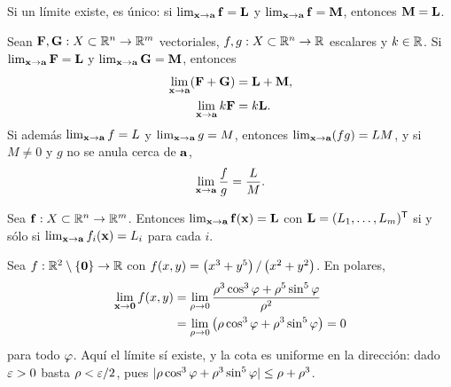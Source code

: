 \begin{teorema}[Unicidad]
  \label{teo:unicidad_limite}
  Si un l\'imite existe, es \'unico: si
  $\lim_{\mathbf{x}\rightarrow\mathbf{a}}\mathbf{f}=\mathbf{L}$ y
  $\lim_{\mathbf{x}\rightarrow\mathbf{a}}\mathbf{f}=\mathbf{M}$, entonces $\mathbf{M}=\mathbf{L}$.
\end{teorema}

\begin{teorema}
  \label{teo:algebra_limites}
  Sean $\mathbf{F},\mathbf{G}:X\subset\mathbb{R}^n\rightarrow\mathbb{R}^m$ vectoriales,
  $f,g:X\subset\mathbb{R}^n\rightarrow\mathbb{R}$ escalares y $k\in\mathbb{R}$. Si
  $\lim_{\mathbf{x}\rightarrow\mathbf{a}}\mathbf{F}=\mathbf{L}$ y
  $\lim_{\mathbf{x}\rightarrow\mathbf{a}}\mathbf{G}=\mathbf{M}$, entonces
  \begin{align}
    \label{eq:limite_suma}
    \lim_{\mathbf{x}\rightarrow\mathbf{a}}(\mathbf{F}+\mathbf{G})&=\mathbf{L}+\mathbf{M},\\
    \label{eq:limite_escalar}
    \lim_{\mathbf{x}\rightarrow\mathbf{a}}k\mathbf{F}&=k\mathbf{L}.
  \end{align}
  Si adem\'as $\lim_{\mathbf{x}\rightarrow\mathbf{a}}f=L$ y
  $\lim_{\mathbf{x}\rightarrow\mathbf{a}}g=M$, entonces
  $\lim_{\mathbf{x}\rightarrow\mathbf{a}}(fg)=LM$, y si $M\neq 0$ y $g$ no se anula
  cerca de $\mathbf{a}$,
  \begin{equation}
    \label{eq:limite_cociente}
    \lim_{\mathbf{x}\rightarrow\mathbf{a}}\frac{f}{g}=\frac{L}{M}.
  \end{equation}
\end{teorema}

\begin{teorema}
  \label{teo:limites_componentes}
  Sea $\mathbf{f}:X\subset\mathbb{R}^n\rightarrow\mathbb{R}^m$. Entonces
  $\lim_{\mathbf{x}\rightarrow\mathbf{a}}\mathbf{f}(\mathbf{x})=\mathbf{L}$ con
  $\mathbf{L}=(L_1,\dots,L_m)^{\mathsf{T}}$ si y s\'olo si
  $\lim_{\mathbf{x}\rightarrow\mathbf{a}}f_i(\mathbf{x})=L_i$ para cada $i$.
\end{teorema}

\begin{ejemplo}
  \label{ej:limite_existe}
  Sea $f:\mathbb{R}^2\setminus\left\{ \mathbf{0} \right\}\rightarrow\mathbb{R}$ con
  $f(x,y)=\left( x^3+y^5 \right)/\left( x^2+y^2 \right)$. En polares,
  \begin{equation}
    \label{eq:limite_polares}
    \begin{aligned}
      \lim_{\mathbf{x}\rightarrow\mathbf{0}}f(x,y)
        &=\lim_{\rho\rightarrow 0}
          \frac{\rho^3\cos^3\varphi+\rho^5\sin^5\varphi}{\rho^2}\\
        &=\lim_{\rho\rightarrow 0}
          \left( \rho\cos^3\varphi+\rho^3\sin^5\varphi \right)=0
    \end{aligned}
  \end{equation}
  para todo $\varphi$. Aqu\'i el l\'imite s\'i existe, y la cota es uniforme en la
  direcci\'on: dado $\varepsilon>0$ basta $\rho<\varepsilon/2$, pues
  $\lvert \rho\cos^3\varphi+\rho^3\sin^5\varphi \rvert\le\rho+\rho^3$.
\end{ejemplo}

